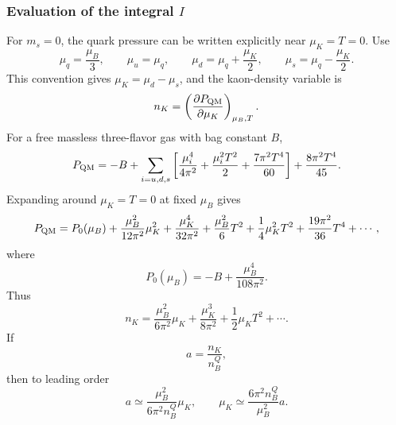 \documentclass[11pt]{article}
\begin{document}
\subsubsection{Evaluation of the integral \(I\)}
\label{sec:massless-integral}

For \(m_s=0\), the quark pressure can be written explicitly near
\(\mu_K=T=0\). Use
\begin{equation}
\mu_q=\frac{\mu_B}{3},\qquad
\mu_u=\mu_q,\qquad
\mu_d=\mu_q+\frac{\mu_K}{2},\qquad
\mu_s=\mu_q-\frac{\mu_K}{2}.
\end{equation}
This convention gives \(\mu_K=\mu_d-\mu_s\), and the kaon-density variable is
\begin{equation}
n_K=\left(\frac{\partial P_{\rm QM}}{\partial \mu_K}\right)_{\mu_B,T}.
\end{equation}
For a free massless three-flavor gas with bag constant \(B\),
\begin{equation}
P_{\rm QM}
=
-B
+
\sum_{i=u,d,s}
\left[
\frac{\mu_i^4}{4\pi^2}
+
\frac{\mu_i^2T^2}{2}
+
\frac{7\pi^2T^4}{60}
\right]
+
\frac{8\pi^2T^4}{45}.
\end{equation}
Expanding around \(\mu_K=T=0\) at fixed \(\mu_B\) gives
\begin{equation}
P_{\rm QM}
=
P_0(\mu_B)
+
\frac{\mu_B^2}{12\pi^2}\mu_K^2
+
\frac{\mu_K^4}{32\pi^2}
+
\frac{\mu_B^2}{6}T^2
+
\frac{1}{4}\mu_K^2T^2
+
\frac{19\pi^2}{36}T^4
+\cdots ,
\end{equation}
where
\begin{equation}
P_0(\mu_B)=-B+\frac{\mu_B^4}{108\pi^2}.
\end{equation}
Thus
\begin{equation}
n_K
=
\frac{\mu_B^2}{6\pi^2}\mu_K
+
\frac{\mu_K^3}{8\pi^2}
+
\frac{1}{2}\mu_KT^2
+\cdots .
\end{equation}
If
\begin{equation}
a=\frac{n_K}{n_B^Q},
\end{equation}
then to leading order
\begin{equation}
a\simeq
\frac{\mu_B^2}{6\pi^2 n_B^Q}\mu_K,
\qquad
\mu_K\simeq
\frac{6\pi^2 n_B^Q}{\mu_B^2}a .
\end{equation}
\end{document}
